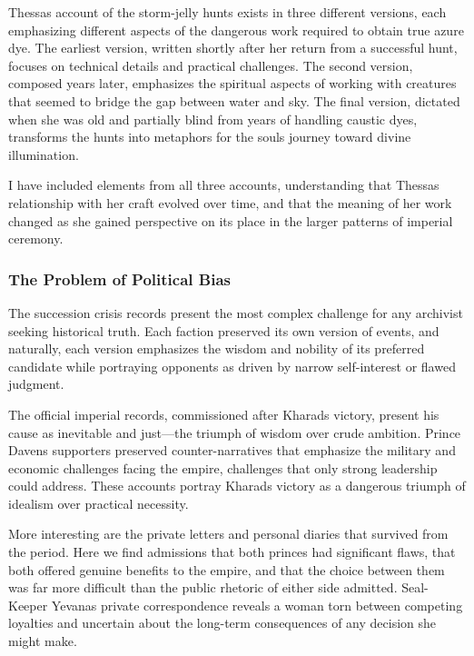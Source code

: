 Thessa\textquotesingle s account of the storm-jelly hunts exists in
three different versions, each emphasizing different aspects of the
dangerous work required to obtain true azure dye. The earliest version,
written shortly after her return from a successful hunt, focuses on
technical details and practical challenges. The second version, composed
years later, emphasizes the spiritual aspects of working with creatures
that seemed to bridge the gap between water and sky. The final version,
dictated when she was old and partially blind from years of handling
caustic dyes, transforms the hunts into metaphors for the
soul\textquotesingle s journey toward divine illumination.

I have included elements from all three accounts, understanding that
Thessa\textquotesingle s relationship with her craft evolved over time,
and that the meaning of her work changed as she gained perspective on
its place in the larger patterns of imperial ceremony.

\subsubsection{The Problem of Political
Bias}\label{the-problem-of-political-bias}

The succession crisis records present the most complex challenge for any
archivist seeking historical truth. Each faction preserved its own
version of events, and naturally, each version emphasizes the wisdom and
nobility of its preferred candidate while portraying opponents as driven
by narrow self-interest or flawed judgment.

The official imperial records, commissioned after
Kharad\textquotesingle s victory, present his cause as inevitable and
just---the triumph of wisdom over crude ambition. Prince
Daven\textquotesingle s supporters preserved counter-narratives that
emphasize the military and economic challenges facing the empire,
challenges that only strong leadership could address. These accounts
portray Kharad\textquotesingle s victory as a dangerous triumph of
idealism over practical necessity.

More interesting are the private letters and personal diaries that
survived from the period. Here we find admissions that both princes had
significant flaws, that both offered genuine benefits to the empire, and
that the choice between them was far more difficult than the public
rhetoric of either side admitted. Seal-Keeper Yevana\textquotesingle s
private correspondence reveals a woman torn between competing loyalties
and uncertain about the long-term consequences of any decision she might
make.


